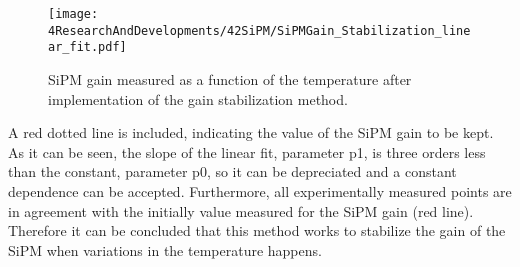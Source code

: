 \begin{figure}[hbtp]
\centering
\texttt{[image: 4ResearchAndDevelopments/42SiPM/SiPMGain\_Stabilization\_linear\_fit.pdf]}
\caption{SiPM gain measured as a function of the temperature after implementation of the gain stabilization method. \label{fig:SiPMGainStabilization}}
\end{figure}

A red dotted line is included, indicating the value of the SiPM gain to be kept. As it can be seen, the slope of the linear fit, parameter p1, is three orders less than the constant, parameter p0, so it can be depreciated and a constant dependence can be accepted. Furthermore, all experimentally measured points are in agreement with the initially value measured for the SiPM gain (red line). Therefore it can be concluded that this method works to stabilize the gain of the SiPM when variations in the temperature happens.